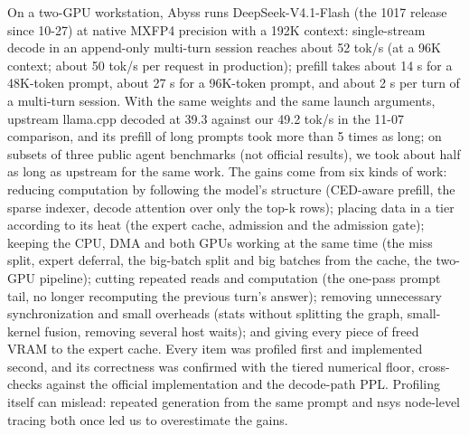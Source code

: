\documentclass[11pt,a4paper]{article}
\newcommand{\tps}{tok/s}
\begin{document}
On a two-GPU workstation, Abyss runs DeepSeek-V4.1-Flash (the 1017 release since 10-27) at native MXFP4 precision with a 192K context: single-stream decode in an append-only multi-turn session reaches about 52 \tps{} (at a 96K context; about 50 \tps{} per request in production); prefill takes about 14 s for a 48K-token prompt, about 27 s for a 96K-token prompt, and about 2 s per turn of a multi-turn session. With the same weights and the same launch arguments, upstream llama.cpp decoded at 39.3 against our 49.2 \tps{} in the 11-07 comparison, and its prefill of long prompts took more than 5 times as long; on subsets of three public agent benchmarks (not official results), we took about half as long as upstream for the same work. The gains come from six kinds of work: reducing computation by following the model's structure (CED-aware prefill, the sparse indexer, decode attention over only the top-k rows); placing data in a tier according to its heat (the expert cache, admission and the admission gate); keeping the CPU, DMA and both GPUs working at the same time (the miss split, expert deferral, the big-batch split and big batches from the cache, the two-GPU pipeline); cutting repeated reads and computation (the one-pass prompt tail, no longer recomputing the previous turn's answer); removing unnecessary synchronization and small overheads (stats without splitting the graph, small-kernel fusion, removing several host waits); and giving every piece of freed VRAM to the expert cache. Every item was profiled first and implemented second, and its correctness was confirmed with the tiered numerical floor, cross-checks against the official implementation and the decode-path PPL. Profiling itself can mislead: repeated generation from the same prompt and nsys node-level tracing both once led us to overestimate the gains.
\end{document}
